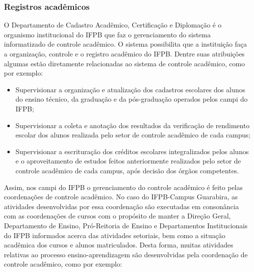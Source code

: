 \subsubsection{Registros acad\^emicos}

	O Departamento de Cadastro Acadêmico, Certificação e Diplomação é o organismo institucional do IFPB que faz o gerenciamento do sistema informatizado de controle acadêmico. O sistema possibilita que a instituição faça a organização, controle e o registro acadêmico do IFPB. Dentre suas atribuições algumas estão diretamente relacionadas ao sistema de controle acadêmico, como por exemplo:

\begin{itemize}
	\item Supervisionar a organização e atualização dos cadastros escolares dos alunos do ensino técnico, da graduação e da pós-graduação operados pelos campi do IFPB;

	\item Supervisionar a coleta e anotação dos resultados da verificação de rendimento escolar dos alunos realizada pelo setor de controle acadêmico de cada campus; 

	\item Supervisionar a escrituração dos créditos escolares integralizados pelos alunos e o aproveitamento de estudos feitos anteriormente realizados pelo setor de controle acadêmico de cada campus, após decisão dos órgãos competentes.
\end{itemize}

          Assim, nos campi do IFPB o gerenciamento do controle acadêmico é feito pelas coordenações de controle acadêmico. No caso do IFPB-Campus Guarabira, as atividades desenvolvidas por essa coordenação são executadas em consonância com as coordenações de cursos com o propósito de manter a Direção Geral, Departamento de Ensino, Pró-Reitoria de Ensino e Departamentos Institucionais do IFPB informados acerca das atividades setoriais, bem como a situação acadêmica dos cursos e alunos matriculados. Desta forma, muitas atividades relativas ao processo ensino-aprendizagem são desenvolvidas pela coordenação de controle acadêmico, como por exemplo:

